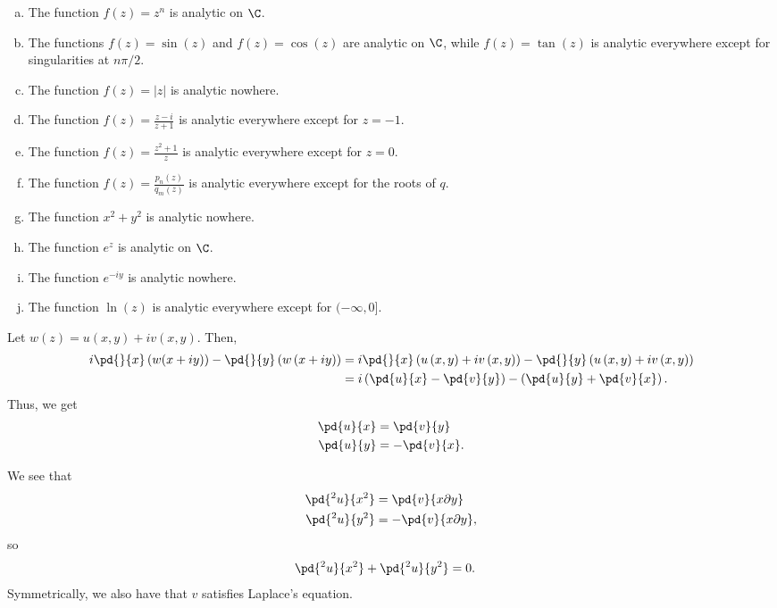 \documentclass[10pt]{mypackage}
\begin{document}
\RaggedRight
\begin{solution}[18.1]\hfill
  \begin{enumerate}[(a)]
    \item The function $f(z) = z^n$ is analytic on $\C$.
    \item The functions $f(z) = \sin(z)$ and $f(z) = \cos(z)$ are analytic on $\C$, while $f(z)= \tan(z)$ is analytic everywhere except for singularities at $n\pi/2$.
    \item The function $f(z) = \left\vert z \right\vert$ is analytic nowhere.
    \item The function $f(z) = \frac{z-i}{z+1}$ is analytic everywhere except for $z = -1$.
    \item The function $f(z) = \frac{z^2 + 1}{z}$ is analytic everywhere except for $z = 0$.
    \item The function $f(z) = \frac{p_n(z)}{q_m(z)}$ is analytic everywhere except for the roots of $q$.
    \item The function $x^2 + y^2$ is analytic nowhere.
    \item The function $e^z$ is analytic on $\C$.
    \item The function $e^{-iy}$ is analytic nowhere.
    \item The function $\ln\left(z\right)$ is analytic everywhere except for $(-\infty,0]$.
  \end{enumerate}
\end{solution}
\begin{solution}[18.2]
  Let $w(z) = u\left(x,y\right) + iv\left(x,y\right)$. Then,
  \begin{align*}
    i\pd{}{x}\left(w(x + iy)\right) - \pd{}{y}\left(w\left(x+ iy\right)\right) &= i \pd{}{x}\left(u\left(x,y\right) + iv\left(x,y\right)\right) - \pd{}{y}\left(u\left(x,y\right) + iv\left(x,y\right)\right)\\
                                                                               &= i\left(\pd{u}{x} - \pd{v}{y}\right) - \left(\pd{u}{y} + \pd{v}{x}\right).
  \end{align*}
  Thus, we get
  \begin{align*}
    \pd{u}{x} &= \pd{v}{y}\\
    \pd{u}{y} &= -\pd{v}{x}.
  \end{align*}
\end{solution}
\begin{solution}[18.4]

\end{solution}
\begin{solution}[18.5]
  We see that
  \begin{align*}
    \pd{^2u}{x^2} &= \pd{v}{x\partial y}\\
    \pd{^2 u}{y^2} &= -\pd{v}{x\partial y},
  \end{align*}
  so 
  \begin{align*}
    \pd{^2u}{x^2} + \pd{^2u}{y^2} &= 0.
  \end{align*}
  Symmetrically, we also have that $v$ satisfies Laplace's equation.
\end{solution}
\end{document}
